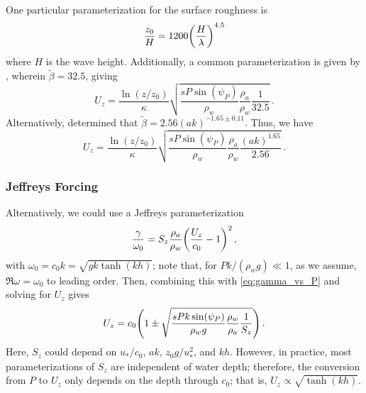 \documentclass{jfm}
\let\Oldsubsubsection\subsubsection
\renewcommand{\subsubsection}{\FloatBarrier\Oldsubsubsection}
\begin{document}
One particular parameterization for the surface roughness
is \citep{taylor2001dependence}
\begin{equation}
  \frac{z_0}{H} = 1200 \pqty{\frac{H}{\lambda}}^{4.5}
\end{equation}
where $H$ is the wave height.
Additionally, a common parameterization is given by
\citet{plant1977growth}, wherein $\tilde{\beta} = 32.5$, giving
\begin{equation}
  U_z = \frac{\ln(z/z_0)}{\kappa} \sqrt{
    \frac{s P \sin(\psi_P)}{\rho_w} \frac{\rho_a}{\rho_w}
    \frac{1}{32.5}}
    \,.
\end{equation}
Alternatively, \citet{grare2013growth} determined that $\tilde{\beta} = 2.56
(ak)^{-1.65 \pm 0.11}$.
Thus, we have
\begin{equation}
  U_z = \frac{\ln(z/z_0)}{\kappa} \sqrt{
    \frac{s P \sin(\psi_P)}{\rho_w} \frac{\rho_a}{\rho_w}
    \frac{(ak)^{1.65}}{2.56}}
    \,.
\end{equation}

\subsubsection{Jeffreys Forcing}
Alternatively, we could use a Jeffreys parameterization
\begin{equation}
  \frac{\gamma}{\omega_0} = S_z \frac{\rho_a}{\rho_w}
    \pqty{\frac{U_z}{c_0}-1}^2 \,,
\end{equation}
with $\omega_0 = c_0 k = \sqrt{gk \tanh(kh)}$; note that, for
$Pk/(\rho_w g) \ll 1$, as we assume, $\Re{\omega} = \omega_0$ to leading
order.
Then, combining this with \cref{eq:gamma_vs_P} and solving for $U_z$
gives
\begin{equation}
  U_z = c_0 \pqty{1 \pm \sqrt{\frac{s P k \sin(\psi_P)}{\rho_w g}
    \frac{\rho_w}{\rho_a} \frac{1}{S_z}}} \,.
\end{equation}
Here, $S_z$ could depend on $u_*/c_0$, $ak$, $z_0 g/u_*^2$, and $kh$.
However, in practice, most parameterizations of $S_{z}$ are independent
of water depth; therefore, the conversion from
$P$ to $U_z$ only depends on the depth through $c_0$; that is, $U_z
\propto \sqrt{\tanh(kh)}$.
\end{document}

